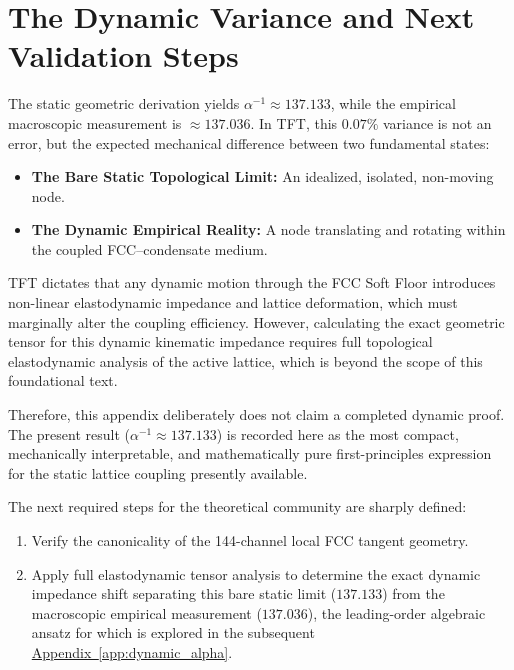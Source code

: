 \section{The Dynamic Variance and Next Validation Steps}
The static geometric derivation yields $\alpha^{-1} \approx 137.133$, while the empirical macroscopic measurement is $\approx 137.036$. In TFT, this $0.07\%$ variance is not an error, but the expected mechanical difference between two fundamental states:
\begin{itemize}
    \item \textbf{The Bare Static Topological Limit:} An idealized, isolated, non-moving node.
    \item \textbf{The Dynamic Empirical Reality:} A node translating and rotating within the coupled FCC–condensate medium.
\end{itemize}

TFT dictates that any dynamic motion through the FCC Soft Floor introduces non-linear elastodynamic impedance and lattice deformation, which must marginally alter the coupling efficiency. However, calculating the exact geometric tensor for this dynamic kinematic impedance requires full topological elastodynamic analysis of the active lattice, which is beyond the scope of this foundational text.

Therefore, this appendix deliberately does not claim a completed dynamic proof. The present result ($\alpha^{-1} \approx 137.133$) is recorded here as the most compact, mechanically interpretable, and mathematically pure first-principles expression for the static lattice coupling presently available.

The next required steps for the theoretical community are sharply defined: 
\begin{enumerate}
    \item Verify the canonicality of the 144-channel local FCC tangent geometry.
    \item Apply full elastodynamic tensor analysis to determine the exact dynamic impedance shift separating this bare static limit ($137.133$) from the macroscopic empirical measurement ($137.036$), the leading-order algebraic ansatz for which is explored in the subsequent \hyperref[app:dynamic_alpha]{Appendix~\ref*{app:dynamic_alpha}}.
\end{enumerate}